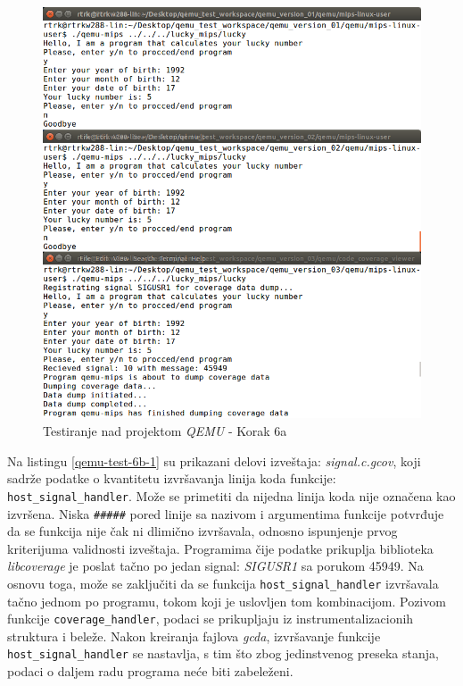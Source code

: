 \documentclass[12pt,oneside]{memoir}
\newcommand{\kod}[1]{\texttt{#1}}
\newcommand{\strano}[1]{\textit{#1}}
\begin{document}
\begin{figure}[!ht]
  \centering
  \includegraphics[width=\textwidth]{img/qemu-test-6a-ng.png}
  \caption{Testiranje nad projektom \strano{QEMU} - Korak 6a}
  \label{fig:qemu-test-6a}
\end{figure} 

\newpage

Na listingu \ref{qemu-test-6b-1} su prikazani delovi izveštaja: \strano{signal.c.gcov}, koji sadrže podatke o kvantitetu izvršavanja linija koda funkcije: \kod{host\_signal\_handler}.
Može se primetiti da nijedna linija koda nije označena kao izvršena. Niska \kod{\#\#\#\#\#} pored linije sa nazivom i argumentima funkcije potvrđuje da se funkcija nije čak ni dlimično izvršavala, odnosno ispunjenje prvog kriterijuma validnosti izveštaja. Programima čije podatke prikuplja biblioteka \strano{libcoverage} je poslat tačno po jedan signal: \strano{SIGUSR1} sa porukom 45949. Na osnovu toga, može se zaključiti da se funkcija \kod{host\_signal\_handler} izvršavala tačno jednom po programu, tokom koji je uslovljen tom kombinacijom. Pozivom funkcije \kod{coverage\_handler}, podaci se prikupljaju iz instrumentalizacionih struktura i beleže. Nakon kreiranja fajlova \strano{gcda}, izvršavanje funkcije \kod{host\_signal\_handler} se nastavlja, s tim što zbog jedinstvenog preseka stanja, podaci o daljem radu programa neće biti zabeleženi. 
\\
\end{document}
